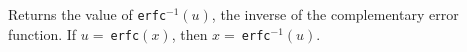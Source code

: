 \begin{tabb} Returns the value of \texttt{erfc}${}^{-1}(u)$, the inverse of the
complementary error function. If $u =\ $\texttt{erfc}$(x)$,
then $x =\ $\texttt{erfc}${}^{-1}(u)$.
\end{tabb}
\begin{htmlonly}
\end{htmlonly}

\begin{code}\begin{hide}
}\end{hide}
\end{code}
